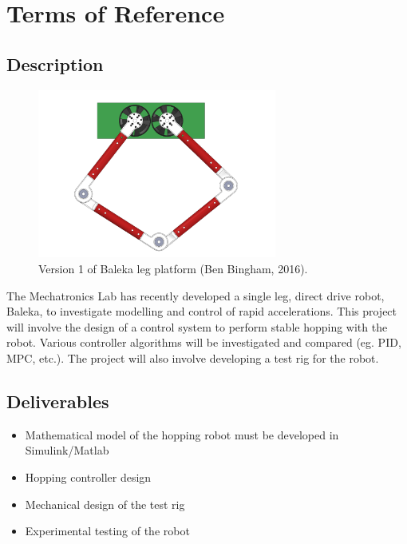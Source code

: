\chapter{Terms of Reference}

\section*{Description}

\begin{figure}[H]
\centering
\includegraphics[width=0.7\textwidth,trim={0cm 0cm 0cm 0cm},clip]{images/mechanical/legsV1.pdf}
\caption{Version 1 of Baleka leg platform (Ben Bingham, 2016).}
\label{fig:legV1}
\end{figure}

The Mechatronics Lab has recently developed a single leg, direct drive robot,
Baleka, to investigate modelling and control of rapid accelerations.
This project will involve the design of a control system to perform stable
hopping with the robot. Various controller algorithms will be investigated and
compared (eg. PID, MPC, etc.). The project will also involve developing a test
rig for the robot.

\section*{Deliverables}

\begin{itemize}
\item Mathematical model of the hopping robot must be developed in
Simulink/Matlab
\item Hopping controller design
\item Mechanical design of the test rig
\item Experimental testing of the robot
\end{itemize}

